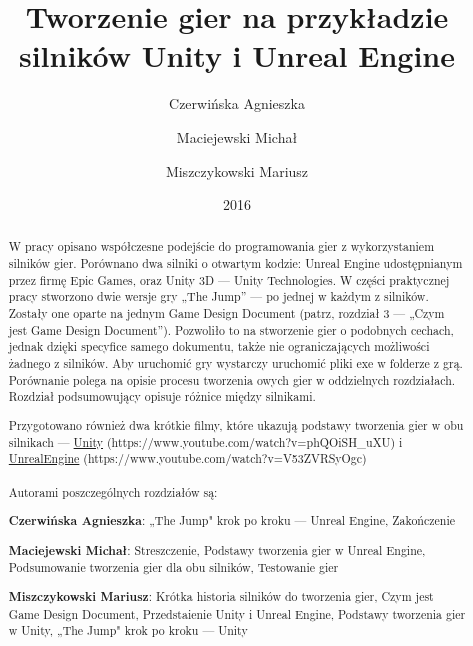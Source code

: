 \documentclass[12pt]{xmgr}
\author   {Czerwińska Agnieszka}
\author   {Maciejewski Michał}
\author   {Miszczykowski Mariusz}
\title    {Tworzenie gier na przykładzie silników Unity i Unreal Engine}
\date     {2016}
\begin{document}
\begin{abstract}
W pracy opisano współczesne podejście do programowania gier z wykorzystaniem silników gier. Porównano dwa silniki o otwartym kodzie: Unreal Engine udostępnianym przez firmę Epic Games, oraz Unity 3D — Unity Technologies. W części praktycznej pracy stworzono dwie wersje gry
„The Jump” — po jednej w każdym z silników. Zostały one oparte na jednym Game Design Document (patrz, rozdział 3 — „Czym jest Game Design Document”). Pozwoliło to na stworzenie gier o podobnych cechach, jednak dzięki specyfice samego dokumentu, także nie ograniczających możliwości żadnego z silników. Aby uruchomić gry wystarczy uruchomić pliki exe w folderze z grą. Porównanie polega na opisie procesu tworzenia owych gier w oddzielnych rozdziałach. Rozdział podsumowujący opisuje różnice między silnikami.

Przygotowano również dwa krótkie filmy, które ukazują podstawy tworzenia gier w obu silnikach — \href{https://www.youtube.com/watch?v=phQOiSH_uXU}{Unity} (https://www.youtube.com/watch?v=phQOiSH\_uXU) i \href{https://www.youtube.com/watch?v=V53ZVRSyOgc}{UnrealEngine} (https://www.youtube.com/watch?v=V53ZVRSyOgc)
\\
\\ 
Autorami poszczególnych rozdziałów są:

\textbf{Czerwińska Agnieszka}: „The Jump" krok po kroku — Unreal Engine, Zakończenie

\textbf{Maciejewski Michał}: Streszczenie, Podstawy tworzenia gier w Unreal Engine, Podsumowanie tworzenia gier dla obu silników, Testowanie gier

\textbf{Miszczykowski Mariusz}: Krótka historia silników do tworzenia gier, Czym jest Game Design Document, Przedstaienie Unity i Unreal Engine, Podstawy tworzenia gier w Unity, „The Jump" krok po kroku — Unity

\end{abstract}



\maketitle

\introduction
\end{document}
